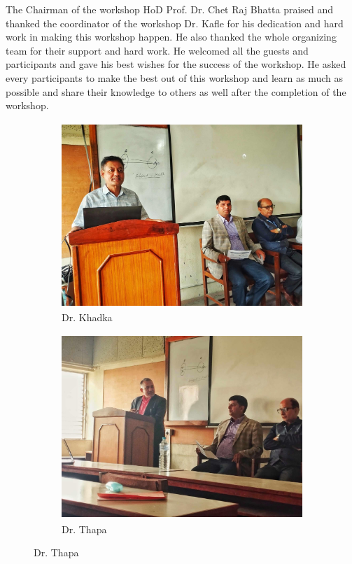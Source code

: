 \documentclass[a4paper,12pt]{report}
\begin{document}
\vspace{5mm}
\noindent
The Chairman of the workshop HoD Prof. Dr. {Chet Raj Bhatta} praised and thanked the coordinator of the workshop Dr. Kafle for his dedication and hard work in making this workshop happen. He also thanked the whole organizing team for their support and hard work. He welcomed all the guests and participants and gave his best wishes for the success of the workshop. He asked every participants to make the best out of this workshop and learn as much as possible and share their knowledge to others as well after the completion of the workshop.
\clearpage


\vspace*{5mm}
\begin{figure}[h!]
\centering
\begin{subfigure}{0.45\textwidth}
    \includegraphics[height=7cm, width=\textwidth]{shreeramsir.jpg}
    \caption{Dr. Khadka}
    \label{fig:first}
\end{subfigure}
\hfill
\begin{subfigure}{0.45\textwidth}
    \includegraphics[height=7cm, width=\textwidth]{gyansir.jpg}
    \caption{Dr. Thapa}
    \label{fig:second}
\end{subfigure}
\end{figure}
\end{document}
